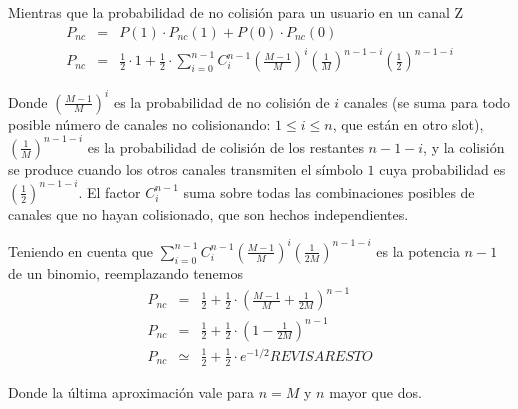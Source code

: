 \noindent Mientras que la probabilidad de no colisión para un usuario en un canal Z
\begin{eqnarray}
P_{nc} & = & P(1) \cdot P_{nc}(1) + P(0) \cdot P_{nc}(0) \\
P_{nc} & = & \frac{1}{2} \cdot 1 +  \frac{1}{2} \cdot \sum_{i=0}^{n-1} 
C^{n-1}_{i} \left(\frac{M-1}{M}\right)^i  \left(\frac{1}{M}\right)^{n-1-i}  \left(\frac{1}{2}\right)^{n-1-i} 
\end{eqnarray}

\noindent Donde $\left(\frac{M-1}{M}\right)^i$ es la probabilidad de no colisión de $i$ canales (se suma para todo posible número de canales no
colisionando: $1\leq i\leq n$, que están en otro slot), $
\left(\frac{1}{M}\right)^{n-1-i}$ es la probabilidad de colisión de los restantes
$n-1-i$, y la colisión se produce cuando los otros canales
transmiten el símbolo $1$ cuya probabilidad es $\left(\frac{1}{2}\right)^{n-1-i}$. El
factor $C^{n-1}_{i}$ suma sobre todas las combinaciones posibles de canales que no
hayan colisionado, que son hechos independientes.

\noindent Teniendo en cuenta que $ \sum_{i=0}^{n-1}
C^{n-1}_{i} \left(\frac{M-1}{M}\right)^i  \left(\frac{1}{2M}\right)^{n-1-i}$ es la potencia $n-1$ de un binomio, reemplazando tenemos
\begin{eqnarray}
P_{nc} & = & \frac{1}{2} +  \frac{1}{2} \cdot \left(\frac{M-1}{M} + \frac{1}{2M} \right)^{n-1} \\
P_{nc} & = & \frac{1}{2} +  \frac{1}{2} \cdot \left(1- \frac{1}{2M} \right)^{n-1} \\
P_{nc} & \simeq & \frac{1}{2} +  \frac{1}{2} \cdot e^{-1/2} REVISAR ESTO
\end{eqnarray}

\noindent Donde la última aproximación vale para $n=M$ y $n$ mayor que dos.

\iffalse

\vspace{5mm}

